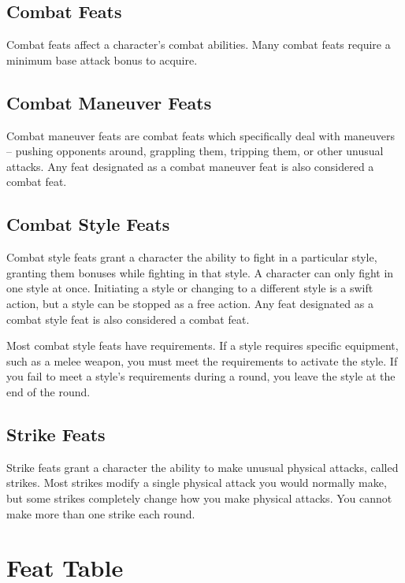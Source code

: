 \subsection{Combat Feats}
Combat feats affect a character's combat abilities. Many combat feats require a minimum base attack bonus to acquire.

\subsection{Combat Maneuver Feats}
Combat maneuver feats are combat feats which specifically deal with maneuvers -- pushing opponents around, grappling them, tripping them, or other unusual attacks. Any feat designated as a combat maneuver feat is also considered a combat feat.

\subsection{Combat Style Feats}
Combat style feats grant a character the ability to fight in a particular style, granting them bonuses while fighting in that style. A character can only fight in one style at once. Initiating a style or changing to a different style is a swift action, but a style can be stopped as a free action. Any feat designated as a combat style feat is also considered a combat feat.

Most combat style feats have requirements. If a style requires specific equipment, such as a melee weapon, you must meet the requirements to activate the style. If you fail to meet a style's requirements during a round, you leave the style at the end of the round.

\subsection{Strike Feats}\label{Strike Feats}
Strike feats grant a character the ability to make unusual physical attacks, called strikes. Most strikes modify a single physical attack you would normally make, but some strikes completely change how you make physical attacks. You cannot make more than one strike each round.

\onecolumn
\section{Feat Table}

